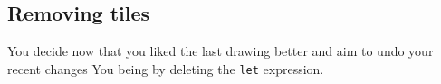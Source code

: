 \subsection{Removing tiles}

You decide now that you liked the last drawing better
and aim to undo your recent changes
You being by deleting the \texttt{let} expression.









